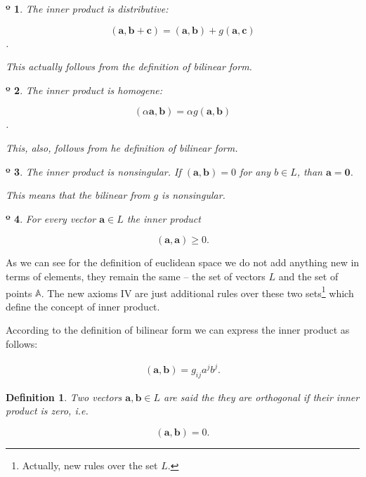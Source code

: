 \documentclass{book}
\newtheorem{definition}{Definition}
\newtheorem{axiom}{º}
\begin{document}
\begin{axiom}
The inner product is distributive:

\[(\boldsymbol{a}, \boldsymbol{b} + \boldsymbol{c}) = (\boldsymbol{a}, \boldsymbol{b}) + g(\boldsymbol{a}, \boldsymbol{c}) \].

This actually follows from the definition of bilinear form.
\end{axiom}

\begin{axiom}
The inner product is homogene:

\[(\alpha\boldsymbol{a}, \boldsymbol{b}) = \alpha g(\boldsymbol{a}, \boldsymbol{b})\].

This, also, follows from he definition of bilinear form.
\end{axiom}

\begin{axiom}
The inner product is nonsingular. If $(\boldsymbol{a}, \boldsymbol{b}) = 0$ for any $b \in L$, than $\boldsymbol{a} = \boldsymbol{0}$.

This means that the bilinear from $g$ is nonsingular.
\end{axiom}

\begin{axiom}
For every vector $\boldsymbol{a} \in L$ the inner product

\[(\boldsymbol{a}, \boldsymbol{a}) \geq 0. \]
\end{axiom}


As we can see for the definition of euclidean space we do not add anything new in terms of elements, they remain the same -- the set of vectors $L$ and the set of points $\mathbb{A}$. The new axioms IV are just additional rules over these two sets\footnote{Actually, new rules over the set $L$.} which define the concept of inner product.

According to the definition of bilinear form we can express the inner product as follows:

\begin{align}
(\boldsymbol{a}, \boldsymbol{b}) = g_{ij}a^jb^j \label{ineer_product_bilinear_from}. 
\end{align}

\begin{definition}
Two vectors $\boldsymbol{a}, \boldsymbol{b} \in L$ are said the they are orthogonal if their inner product is zero, i.e.

\[(\boldsymbol{a}, \boldsymbol{b}) = 0.\]
\end{definition}
\end{document}
